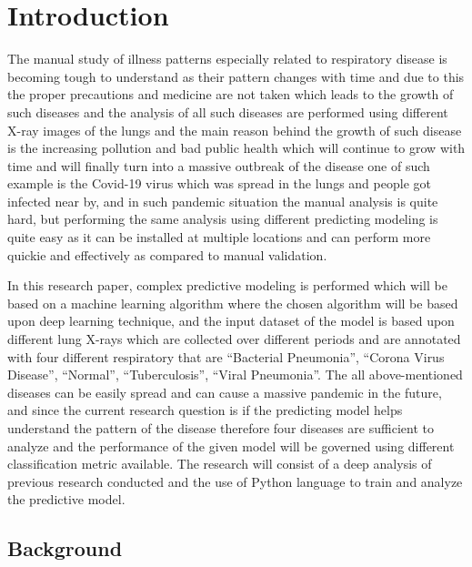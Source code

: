 \chapter{Introduction}
\label{ch:into} %

The manual study of illness patterns especially related to respiratory disease\cite{Zimlich} is 
becoming tough to understand as their pattern changes with time and due to this the proper 
precautions and medicine are not taken which leads to the growth of such diseases and the 
analysis of all such diseases are performed using different X-ray images of the lungs and the 
main reason behind the growth of such disease is the increasing pollution and bad public health 
which will continue to grow with time and will finally turn into a massive outbreak of the 
disease one of such example is the Covid-19\cite{WHO} virus  which was spread in the lungs and 
people got infected near by, and in such pandemic situation the manual analysis is quite hard, 
but performing the same analysis using different predicting modeling is quite easy as it can be 
installed at multiple locations and can perform more quickie and effectively as compared to 
manual validation. 

In this research paper, complex predictive modeling is performed which will be based on a 
machine learning algorithm where the chosen algorithm will be based upon deep learning 
technique, and the input dataset \cite{Kaggle} of the model is based upon different lung X-rays 
which are collected over different periods and are annotated with four different respiratory 
that are “Bacterial Pneumonia”, “Corona Virus Disease”, “Normal”, “Tuberculosis”, “Viral 
Pneumonia”. The all above-mentioned diseases can be easily spread and can cause a massive 
pandemic in the future, and since the current research question is if the predicting model 
helps understand the pattern of the disease therefore four diseases are sufficient to analyze 
and the performance of the given model will be governed using different classification metric 
\cite{JP} available. The research will consist of a deep analysis of previous research 
conducted and the use of Python language to train and analyze the predictive model.

\section{Background}
\label{sec:into_back}

